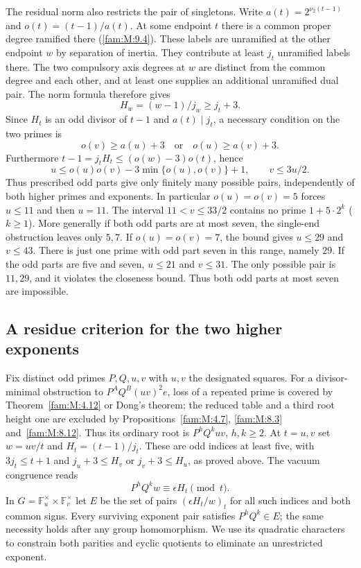 \documentclass[11pt,a4paper]{article}
\numberwithin{equation}{section}
\theoremstyle{remark}
\begin{document}
The residual norm also restricts the pair of singletons.
Write $a(t)=2^{\nu_2(t-1)}$ and $o(t)=(t-1)/a(t)$. At some
endpoint $t$ there is a common proper degree ramified there (\ref{fam:M:9.4}).
These labels are unramified at the other endpoint $w$ by separation
of inertia. They contribute at least $j_t$ unramified labels there.
The two compulsory axis degrees at $w$ are distinct from the
common degree and each other, and at least one supplies an additional
unramified dual pair. The norm formula therefore gives
\[
 H_w=(w-1)/j_w \ge j_t+3.
\]
Since $H_t$ is an odd divisor of $t-1$ and $a(t)\mid j_t$, a
necessary condition on the two primes is
\[
     o(v)\ge a(u)+3\quad\text{or}\quad o(u)\ge a(v)+3.
\]
Furthermore $t-1=j_tH_t\le(o(w)-3)o(t)$, hence
\[
    u\le o(u)o(v)-3\min\{o(u),o(v)\}+1,\qquad v\le3u/2.
\]
Thus prescribed odd parts give only finitely many possible pairs,
independently of both higher primes and exponents. In particular
$o(u)=o(v)=5$ forces $u\le11$ and then $u=11$. The interval
$11<v\le33/2$ contains no prime $1+5\cdot2^k$ ($k\ge1$).
More generally if both odd parts are at most seven, the single-end
obstruction leaves only $5,7$. If $o(u)=o(v)=7$, the bound gives
$u\le29$ and $v\le43$. There is just one prime with odd part seven
in this range, namely $29$. If the odd parts are five and seven,
$u\le21$ and $v\le31$. The only possible pair is $11,29$, and
it violates the closeness bound. Thus both odd parts at most seven
are impossible.

\subsection{A residue criterion for the two higher exponents}\label{merge:residue-group}
Fix distinct odd primes $P,Q,u,v$ with $u,v$ the designated squares.
For a divisor-minimal obstruction to $P^A Q^B(uv)^2e$, loss of a
repeated prime is covered by Theorem~\ref{fam:M:4.12} or Dong's theorem;
the reduced table and a third root height one are excluded by
Propositions~\ref{fam:M:4.7}, \ref{fam:M:8.3} and~\ref{fam:M:8.12}.
Thus its ordinary root is $P^h Q^kuv$, $h,k\ge2$.
At $t=u,v$ set $w=uv/t$ and $H_t=(t-1)/j_t$. These are odd
indices at least five, with $3j_t\le t+1$ and $j_u+3\le H_v$ or
$j_v+3\le H_u$, as proved above. The vacuum congruence reads
\[
                 P^hQ^kw\equiv \epsilon H_t\pmod t.
\]
In $G=\mathbb F_u^\times\times\mathbb F_v^\times$ let $E$ be the
set of pairs $(\epsilon H_t/w)_t$ for all such indices and both
common signs. Every surviving exponent pair satisfies
$P^hQ^k\in E$; the same necessity holds after any group homomorphism.
We use its quadratic characters to constrain both parities and cyclic
quotients to eliminate an unrestricted exponent.
\end{document}
